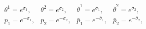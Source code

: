\begin{equation}
\begin{array}{llll}
\theta^1 = e^{\sigma_1},& \theta^2 = e^{\sigma_2}, &
\bar{\theta}^1= e^{\bar{\sigma}_1},& \bar{\theta}^2 =
e^{\bar{\sigma}_2},          \nonumber \\
p_1 = e^{-\sigma_1},& p_2 = e^{-\sigma_2},& \bar{p}_1 =
e^{-\bar{\sigma}_1},& \bar{p}_2 = e^{-\bar{\sigma}_2},
\end{array}
\end{equation}

